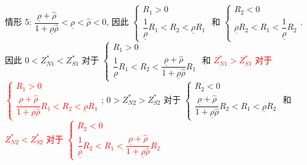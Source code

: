 \documentclass[10.0pt]{article}
\newcommand{\hhred}{\textcolor{red}}
\begin{document}
情形 5: $ \dfrac{\underline{\rho} + {\hat \rho}}{1 + \underline{\rho} {\hat \rho}} < \underline{\rho} < {\hat \rho} < 0 $, 因此 $ \left\{ \begin{matrix} R_1 > 0 \\ \dfrac{1}{\underline{\rho}} R_1 < R_2 < \underline{\rho} R_1 \end{matrix} \right. $ 和 $ \left\{ \begin{matrix} R_2 < 0 \\ \underline{\rho} R_2 < R_1 < \dfrac{1}{\underline{\rho}} R_2 \end{matrix} \right. $.
因此 $ 0 < Z_{N 1}^* < Z_{S 1}^* $ 对于 $ \left\{ \begin{matrix} R_1 > 0 \\ \dfrac{1}{\underline{\rho}} R_1 < R_2 < \dfrac{\underline{\rho} + {\hat \rho}}{1 + \underline{\rho} {\hat \rho}} R_1 \end{matrix} \right. $ 和 \hhred{$ Z_{N 1}^* > Z_{S 1}^* $ 对于 $ \left\{ \begin{matrix} R_1 > 0 \\ \dfrac{\underline{\rho} + {\hat \rho}}{1 + \underline{\rho} {\hat \rho}} R_1 < R_2 < \underline{\rho} R_1 \end{matrix} \right. $}; 
$ 0 > Z_{N 2}^* > Z_{S 2}^* $ 对于 $ \left\{ \begin{matrix} R_2 < 0 \\ \dfrac{\underline{\rho} + {\hat \rho}}{1 + \underline{\rho} {\hat \rho}} R_2 < R_1 < \underline{\rho} R_2 \end{matrix} \right. $ 和 \hhred{$ Z_{N 2}^* < Z_{S 2}^* $ 对于 $ \left\{ \begin{matrix} R_2 < 0 \\ \dfrac{1}{\underline{\rho}} R_2 < R_1 < \dfrac{\underline{\rho} + {\hat \rho}}{1 + \underline{\rho} {\hat \rho}} R_2 \end{matrix} \right. $}
\end{document}
